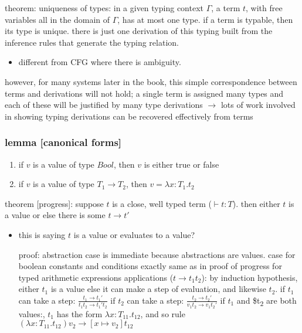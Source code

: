 \documentclass[11pt]{article}
\begin{document}
theorem: uniqueness of types: in a given typing context \(\Gamma\), a term \(t\), with free variables all in the domain of \(\Gamma\), has at most one type. if a term is typable, then its type is unique. there is just one derivation of this typing built from the inference rules that generate the typing relation.
\begin{itemize}
\item different from CFG where there is ambiguity.
\end{itemize}

however, for many systems later in the book, this simple correspondence between terms and derivations will not hold; a single term is assigned many types and each of these will be justified by many type derivations \(\rightarrow\) lots of work involved in showing typing derivations can be recovered effectively from terms

\subsubsection{lemma [canonical forms]}
\label{sec:orgba10307}
\begin{enumerate}
\item if \(v\) is a value of type \(Bool\), then \(v\) is either true or false
\item if \(v\) is a value of type \(T_1 \rightarrow T_2\), then \(v = \lambda x: T_1.t_2\)
\end{enumerate}

theorem [progress]: suppose \(t\) is a close, well typed term (\(\vdash t: T\)). then either \(t\) is a value or else there is some \(t \rightarrow t'\)
\begin{itemize}
\item this is saying \(t\) is a value or evaluates to a value?

proof: abstraction case is immediate because abstractions are values. case for boolean constants and conditions exactly same as in proof of progress for typed arithmetic expressions
applications (\(t \rightarrow t_1 t_2\)): by induction hypothesis, either \(t_1\) is a value else it can make a step of evaluation, and likewise \(t_2\).
if \(t_1\) can take a step: \(\tfrac{t_1 \rightarrow t_1'}{t_1 t_2 \rightarrow t_1' t_2}\)
if \(t_2\) can take a step: \(\tfrac{t_2 \rightarrow t_2'}{v_1 t_2 \rightarrow v_1 t_2'}\)
if \(t_1\) and \$t\textsubscript{2} are both values:, \(t_1\) has the form \(\lambda x:T_{11}.t_{12}\),
and so rule \((\lambda x: T_{11}.t_{12}) v_2 \rightarrow [x \mapsto v_2]t_{12}\)
\end{itemize}
\end{document}
